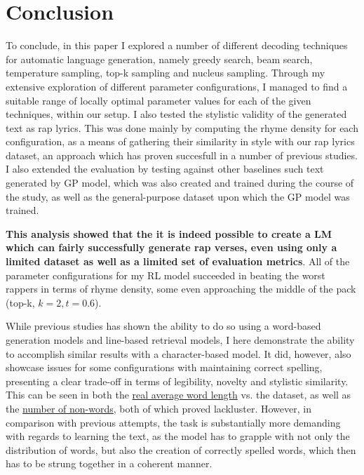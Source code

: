 \section{Conclusion}
\label{chap:conclusion}

To conclude, in this paper I explored a number of different decoding techniques for automatic language generation, namely greedy search, beam search, temperature sampling, top-k sampling and nucleus sampling. Through my extensive exploration of different parameter configurations, I managed to find a suitable range of locally optimal parameter values for each of the given techniques, within our setup. I also tested the stylistic validity of the generated text as rap lyrics. This was done mainly by computing the rhyme density for each configuration, as a means of gathering their similarity in style with our rap lyrics dataset, an approach which has proven succesfull in a number of previous studies. I also extended the evaluation by testing against other baselines such text generated by GP model, which was also created and trained during the course of the study, as well as the general-purpose dataset upon which the GP model was trained.

\textbf{This analysis showed that the it is indeed possible to create a LM which can fairly successfully generate rap verses, even using only a limited dataset as well as a limited set of evaluation metrics}. All of the parameter configurations for my RL model succeeded in beating the worst rappers in terms of rhyme density, some even approaching the middle of the pack (top-k, $k=2, t=0.6$).

While previous studies \cite{PotashPeter2016ECLG} \cite{potash-etal-2015-ghostwriter} \cite{Malmi_2016} has shown the ability to do so using a word-based generation models and line-based retrieval models, I here demonstrate the ability to accomplish similar results with a character-based model. It did, however, also showcase issues for some configurations with maintaining correct spelling, presenting a clear trade-off in terms of legibility, novelty and stylistic similarity. This can be seen in both the \hyperref[sec:gen+eval]{real average word length} vs. the dataset, as well as the \hyperref[fig:non-words]{number of non-words}, both of which proved lackluster. However, in comparison with previous attempts, the task is substantially more demanding with regards to learning the text, as the model has to grapple with not only the distribution of words, but also the creation of correctly spelled words, which then has to be strung together in a coherent manner.

